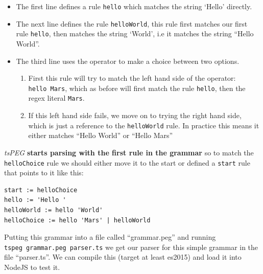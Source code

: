 \begin{itemize}

\item
  The first line defines a rule \texttt{hello} which matches the string
  `Hello' directly.
\item
  The next line defines the rule \texttt{helloWorld}, this rule first
  matches our first rule \texttt{hello}, then matches the string
  `World', i.e it matches the string ``Hello World''.
\item
  The third line uses the \texttt{\textbar{}} operator to make a choice
  between two options.

  \begin{enumerate}
  \def\labelenumi{\arabic{enumi}.}
  
  \item
    First this rule will try to match the left hand side of the
    operator: \texttt{hello\ \textquotesingle{}Mars\textquotesingle{}},
    which as before will first match the rule \texttt{hello}, then the
    regex literal \texttt{Mars}.
  \item
    If this left hand side fails, we move on to trying the right hand
    side, which is just a reference to the \texttt{helloWorld} rule. In
    practice this means it either matches ``Hello World'' or ``Hello
    Mars''
  \end{enumerate}
\end{itemize}

\emph{tsPEG} \textbf{starts parsing with the first rule in the grammar}
so to match the \texttt{helloChoice} rule we should either move it to
the start or defined a \texttt{start} rule that points to it like this:

\begin{verbatim}
start := helloChoice
hello := 'Hello '
helloWorld := hello 'World'
helloChoice := hello 'Mars' | helloWorld
\end{verbatim}

Putting this grammar into a file called ``grammar.peg'' and running
\texttt{tspeg\ grammar.peg\ parser.ts} we get our parser for this simple
grammar in the file ``parser.ts''. We can compile this (target at least
es2015) and load it into NodeJS to test it.

